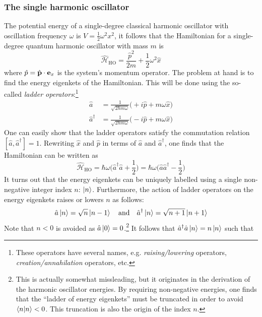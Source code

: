 \documentclass[nofootinbib,reprint,english]{revtex4-1}
\newcommand{\hatHH}{\hat{\mathcal{H}}}
\begin{document}
\subsubsection{The single harmonic oscillator}
The potential energy of a single-degree classical harmonic oscillator with oscillation frequency \(\omega\) is \(V=\frac{1}{2}\omega^2x^2\), it follows that the Hamiltonian for a single-degree quantum harmonic oscillator with mass \(m\) is
\begin{equation}\label{eq:Hamiltonian_harmonic_oscillator}
\hatHH_\text{HO}=\frac{\hat{p}^2}{2m}+\frac{1}{2}\omega^2\hat{x}
\end{equation}
where \(\hat{p}=\hat{\vb{p}}\cdot\vb{e}_x\) is the system's momentum operator. The problem at hand is to find the energy eigenkets of the Hamiltonian. This will be done using the so-called \emph{ladder operators}:\footnote{These operators have several names, e.g. \emph{raising/lowering} operators, \emph{creation/annahilation} operators, etc.}
\begin{subequations}\label{eq:harmonic_oscillator_ladder_operators}
\begin{align}
        \hat{a}&=\frac{1}{\sqrt{2\hbar m\omega}}\big(+i\hat{p}+m\omega\hat{x}\big)\\
\hat{a}^\dagger&=\frac{1}{\sqrt{2\hbar m\omega}}\big(-i\hat{p}+m\omega\hat{x}\big)
\end{align}
\end{subequations}
One can easily show that the ladder operators satisfy the commutation relation \([\hat{a},\hat{a}^\dagger]=1\). Rewriting \(\hat{x}\) and \(\hat{p}\) in terms of \(\hat{a}\) and \(\hat{a}^\dagger\), one finds that the Hamiltonian can be written as
\begin{equation}
\hatHH_\text{HO}=\hbar\omega\bigg(\hat{a}^\dagger\hat{a}+\frac{1}{2}\bigg)=\hbar\omega\bigg(\hat{a}\hat{a}^\dagger-\frac{1}{2}\bigg)
\end{equation}
It turns out that the energy eigenkets can be uniquely labelled using a single non-negative integer index \(n\): \(\ket{n}\). Furthermore, the action of ladder operators on the energy eigenkets raises or lowers \(n\) as follows:
\begin{equation}\label{eq:ladder_operations}
\hat{a}\ket{n}=\sqrt{n}\ket{n-1}\qand\hat{a}^\dagger\ket{n}=\sqrt{n+1}\ket{n+1}
\end{equation}
Note that \(n<0\) is avoided as \(\hat{a}\ket{0}=0\).\footnote{This is actually somewhat missleading, but it originates in the derivation of the harmonic oscillator energies. By requiring non-negative energies, one finds that the ``ladder of energy eigenkets'' must be truncated in order to avoid \(\braket{n}<0\). This truncation is also the origin of the index \(n\).} It follows that \(\hat{a}^\dagger\hat{a}\ket{n}=n\ket{n}\) such that
\end{document}
